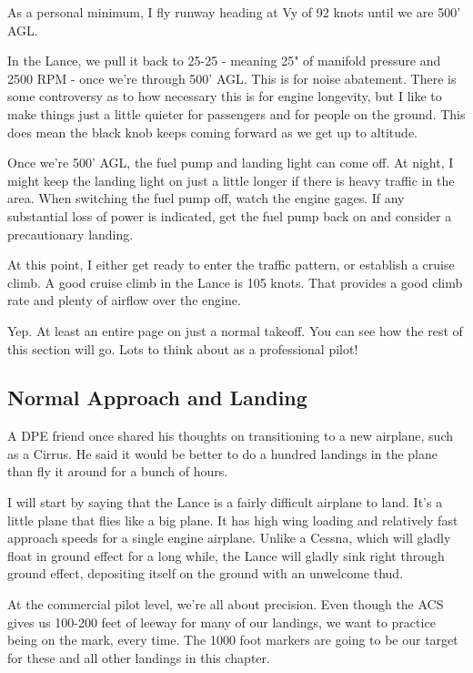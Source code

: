 As a personal minimum, I fly runway heading at Vy of 92 knots until we are 500' AGL.

In the Lance, we pull it back to 25-25 - meaning 25" of manifold pressure and 2500 RPM - once we're through 500' AGL. This is for noise abatement. There is some controversy as to how necessary this is for engine longevity, but I like to make things just a little quieter for passengers and for people on the ground. This does mean the black knob keeps coming forward as we get up to altitude.

Once we're 500' AGL, the fuel pump and landing light can come off. At night, I might keep the landing light on just a little longer if there is heavy traffic in the area. When switching the fuel pump off, watch the engine gages. If any substantial loss of power is indicated, get the fuel pump back on and consider a precautionary landing.

At this point, I either get ready to enter the traffic pattern, or establish a cruise climb. A good cruise climb in the Lance is 105 knots. That provides a good climb rate and plenty of airflow over the engine.

Yep. At least an entire page on just a normal takeoff. You can see how the rest of this section will go. Lots to think about as a professional pilot!

\subsection{Normal Approach and Landing}

A DPE friend once shared his thoughts on transitioning to a new airplane, such as a Cirrus. He said it would be better to do a hundred landings in the plane than fly it around for a bunch of hours.

I will start by saying that the Lance is a fairly difficult airplane to land. It's a little plane that flies like a big plane. It has high wing loading and relatively fast approach speeds for a single engine airplane. Unlike a Cessna, which will gladly float in ground effect for a long while, the Lance will gladly sink right through ground effect, depositing itself on the ground with an unwelcome thud.

At the commercial pilot level, we're all about precision. Even though the ACS gives us 100-200 feet of leeway for many of our landings, we want to practice being on the mark, every time. The 1000 foot markers are going to be our target for these and all other landings in this chapter.

